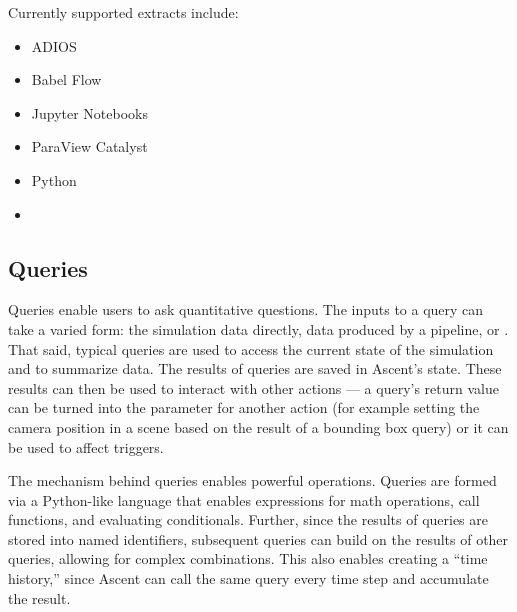 Currently supported extracts include:
\begin{itemize}
\item ADIOS
\item Babel Flow~\cite{babelflow}
\item Jupyter Notebooks
\item ParaView Catalyst
\item Python
\item {}
\end{itemize}

\subsection{Queries}
\label{action_queries}
Queries enable users to ask quantitative questions.
%
The inputs to a query can take a varied form: 
the simulation data directly, 
data produced by a pipeline, 
or .
%
That said, typical queries are used to access the current state of the simulation
and to summarize data.
%
The results of queries are saved in Ascent's state.
%
These results can then be used to
interact with other actions --- a query's return value can be turned
into the parameter for another action (for example setting the camera position in a scene based
on the result of a bounding box query) or it can be used to affect triggers.
%

The mechanism behind queries enables powerful operations.
%
Queries are formed via a Python-like language that
enables expressions for math operations,
call functions, and evaluating conditionals.
%
Further, since the results of queries are stored into named identifiers, subsequent queries
can build on the results of other queries, allowing for complex combinations.
%
%
This also enables creating a ``time history,'' since 
Ascent can call the same query every time step and accumulate the result.


%
%

